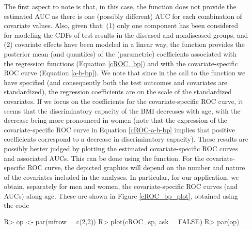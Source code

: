 The first aspect to note is that, in this case, the  function does not provide the estimated AUC as there is one (possibly different) AUC for each combination of covariate values. Also, given that: (1) only one component has been considered for modeling the CDFs of test results in the diseased and nondiseased groups, and (2) covariate effects have been modeled in a linear way, the  function provides the posterior mean (and quantiles) of the (parametric) coefficients associated with the regression functions (Equation \eqref{cROC_bp}) and with the covariate-specific ROC curve (Equation \eqref{a-b-bp}). We note that since in the call to the function we have specified  (and consequently both the test outcomes and covariates are standardized), the regression coefficients are on the scale of the standardized covariates. If we focus on the coefficients for the covariate-specific ROC curve, it seems that the discriminatory capacity of the BMI decreases with age, with the decrease being more pronounced in women (note that the expression of the covariate-specific ROC curve in Equation \eqref{cROC-a-b-bp} implies that positive coefficients correspond to a decrease in discriminatory capacity). These results are possibly better judged by plotting the estimated covariate-specific ROC curves and associated AUCs. This can be done using the  function. For the covariate-specific ROC curve, the depicted graphics will depend on the number and nature of the covariates included in the analyses. In particular, for our application, we obtain, separately for men and women, the covariate-specific ROC curves (and AUCs) along age. These are shown in Figure \ref{cROC_bp_plot}, obtained using the code
\begin{example}
R> op <- par(mfrow = c(2,2))
R> plot(cROC_sp, ask = FALSE)
R> par(op)
\end{example}

